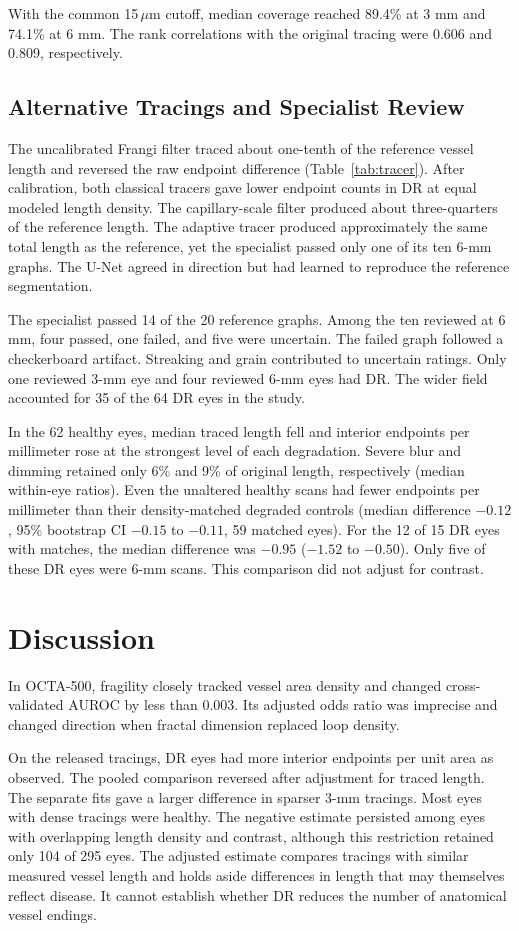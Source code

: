 \documentclass[letterpaper]{article}
\begin{document}
With the common 15\,$\mu$m cutoff, median coverage reached 89.4\% at 3 mm and 74.1\% at 6 mm. The rank correlations with the original tracing were 0.606 and 0.809, respectively.

\subsection{Alternative Tracings and Specialist Review}
The uncalibrated Frangi filter traced about one-tenth of the reference vessel length and reversed the raw endpoint difference (Table~\ref{tab:tracer}). After calibration, both classical tracers gave lower endpoint counts in DR at equal modeled length density. The capillary-scale filter produced about three-quarters of the reference length. The adaptive tracer produced approximately the same total length as the reference, yet the specialist passed only one of its ten 6-mm graphs. The U-Net agreed in direction but had learned to reproduce the reference segmentation.

The specialist passed 14 of the 20 reference graphs. Among the ten reviewed at 6 mm, four passed, one failed, and five were uncertain. The failed graph followed a checkerboard artifact. Streaking and grain contributed to uncertain ratings. Only one reviewed 3-mm eye and four reviewed 6-mm eyes had DR. The wider field accounted for 35 of the 64 DR eyes in the study.

In the 62 healthy eyes, median traced length fell and interior endpoints per millimeter rose at the strongest level of each degradation. Severe blur and dimming retained only 6\% and 9\% of original length, respectively (median within-eye ratios). Even the unaltered healthy scans had fewer endpoints per millimeter than their density-matched degraded controls (median difference $-0.12$, 95\% bootstrap CI $-0.15$ to $-0.11$, 59 matched eyes). For the 12 of 15 DR eyes with matches, the median difference was $-0.95$ ($-1.52$ to $-0.50$). Only five of these DR eyes were 6-mm scans. This comparison did not adjust for contrast.

\section{Discussion}
In OCTA-500, fragility closely tracked vessel area density and changed cross-validated AUROC by less than 0.003. Its adjusted odds ratio was imprecise and changed direction when fractal dimension replaced loop density.

On the released tracings, DR eyes had more interior endpoints per unit area as observed. The pooled comparison reversed after adjustment for traced length. The separate fits gave a larger difference in sparser 3-mm tracings. Most eyes with dense tracings were healthy. The negative estimate persisted among eyes with overlapping length density and contrast, although this restriction retained only 104 of 295 eyes. The adjusted estimate compares tracings with similar measured vessel length and holds aside differences in length that may themselves reflect disease. It cannot establish whether DR reduces the number of anatomical vessel endings.
\end{document}
